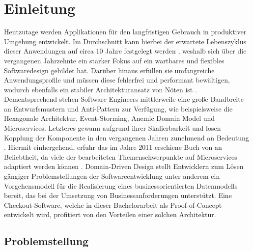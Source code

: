 

\chapter{Einleitung}

Heutzutage werden Applikationen für den langfristigen Gebrauch in produktiver Umgebung entwickelt. Im Durchschnitt kann hierbei der erwartete Lebenszyklus dieser Anwendungen auf circa 10 Jahre festgelegt werden \cite{Tamai.1992}, weshalb sich über die vergangenen Jahrzehnte ein starker Fokus auf ein wartbares und flexibles Softwaredesign gebildet hat. Darüber hinaus erfüllen sie umfangreiche Anwendungsprofile und müssen diese fehlerfrei und performant bewältigen, wodurch ebenfalls ein stabiler Architekturansatz von Nöten ist \cite{Bosch.2001}. Dementsprechend stehen Software Engineers mittlerweile eine große Bandbreite an Entwurfsmustern und Anti-Pattern zur Verfügung, wie beispielsweise die Hexagonale Architektur, Event-Storming, Anemic Domain Model und Microservices. Letzteres gewann aufgrund ihrer Skalierbarkeit und losen Kopplung der Komponente in den vergangenen Jahren zunehmend an Bedeutung \cite{oreilly.Microservices, Sampaio.2017}. Hiermit einhergehend, erfuhr das im Jahre 2011 erschiene Buch  von \citeauthor{Evans.2011} an Beliebtheit, da viele der bearbeiteten Themenschwerpunkte auf Microservices adaptiert werden können \cite[S. 130ff.]{Vernon.2015}\cite{Microservice.DDD.2017}. Domain-Driven Design stellt Entwicklern zum Lösen gängiger Problemstellungen der Softwareentwicklung unter anderem ein Vorgehensmodell für die Realisierung eines businessorientierten Datenmodells bereit, das bei der Umsetzung von Businessanforderungen unterstützt. Eine Checkout-Software, welche in dieser Bachelorarbeit als Proof-of-Concept entwickelt wird, profitiert von den Vorteilen einer solchen Architektur. 


\section{Problemstellung}


